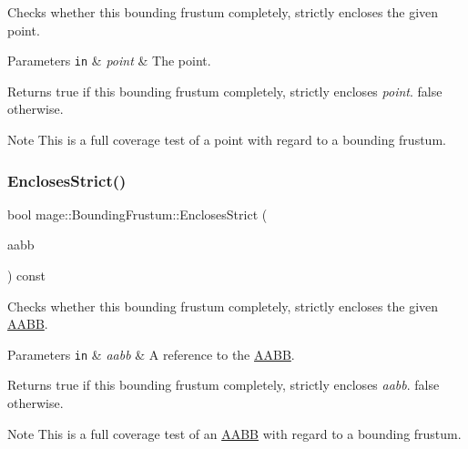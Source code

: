 Checks whether this bounding frustum completely, strictly encloses the given point.


\begin{DoxyParams}[1]{Parameters}
\mbox{\tt in}  & {\em point} & The point. \\
\hline
\end{DoxyParams}
\begin{DoxyReturn}{Returns}
{\ttfamily true} if this bounding frustum completely, strictly encloses {\itshape point}. {\ttfamily false} otherwise. 
\end{DoxyReturn}
\begin{DoxyNote}{Note}
This is a full coverage test of a point with regard to a bounding frustum. 
\end{DoxyNote}
\mbox{\label{classmage_1_1_bounding_frustum_aacdbcc48558489bec9ad87d52104626d}} 
\subsubsection{\texorpdfstring{Encloses\+Strict()}{EnclosesStrict()}\hspace{0.1cm}{\footnotesize\ttfamily [3/4]}}
{\footnotesize\ttfamily bool mage\+::\+Bounding\+Frustum\+::\+Encloses\+Strict (\begin{DoxyParamCaption}\item[{const \mbox{\hyperlink{classmage_1_1_a_a_b_b}{A\+A\+BB}} \&}]{aabb }\end{DoxyParamCaption}) const\hspace{0.3cm}{\ttfamily [noexcept]}}

Checks whether this bounding frustum completely, strictly encloses the given \mbox{\hyperlink{classmage_1_1_a_a_b_b}{A\+A\+BB}}.


\begin{DoxyParams}[1]{Parameters}
\mbox{\tt in}  & {\em aabb} & A reference to the \mbox{\hyperlink{classmage_1_1_a_a_b_b}{A\+A\+BB}}. \\
\hline
\end{DoxyParams}
\begin{DoxyReturn}{Returns}
{\ttfamily true} if this bounding frustum completely, strictly encloses {\itshape aabb}. {\ttfamily false} otherwise. 
\end{DoxyReturn}
\begin{DoxyNote}{Note}
This is a full coverage test of an \mbox{\hyperlink{classmage_1_1_a_a_b_b}{A\+A\+BB}} with regard to a bounding frustum. 
\end{DoxyNote}
\mbox{\label{classmage_1_1_bounding_frustum_ae3dce877ac0e87dd6b9f7f8644c8bcfc}} 
